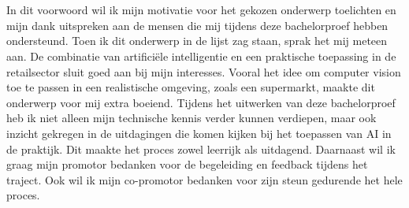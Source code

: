 
\chapter*{}%
\label{ch:voorwoord}


In dit voorwoord wil ik mijn motivatie voor het gekozen onderwerp toelichten en mijn dank uitspreken aan de mensen die mij tijdens deze bachelorproef hebben ondersteund.
Toen ik dit onderwerp in de lijst zag staan, sprak het mij meteen aan. De combinatie van artificiële intelligentie en een praktische toepassing in de retailsector sluit goed aan bij mijn interesses. 
Vooral het idee om computer vision toe te passen in een realistische omgeving, zoals een supermarkt, maakte dit onderwerp voor mij extra boeiend.
Tijdens het uitwerken van deze bachelorproef heb ik niet alleen mijn technische kennis verder kunnen verdiepen, maar ook inzicht gekregen in de uitdagingen die komen kijken bij het toepassen van AI in de praktijk. Dit maakte het proces zowel leerrijk als uitdagend.
Daarnaast wil ik graag mijn promotor bedanken voor de begeleiding en feedback tijdens het traject. Ook wil ik mijn co-promotor bedanken voor zijn steun gedurende het hele proces.
